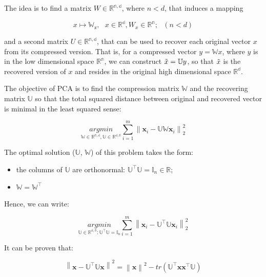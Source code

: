 \documentclass{article}
\begin{document}
The idea is to find a matrix $W \in \mathbb{R^{n,d}}$, where $n < d$, that induces a mapping

\begin{equation}
x \mapsto \mathbb{W_{x}}, ~~~ x \in \mathbb{R^{d}}, W_{x} \in \mathbb{R^{n}};  ~~~ (n<d)
\end{equation}

and a second matrix $U \in \mathbb{R^{n,d}}$, that can be used to recover each original vector $x$ from its compressed version. That is, for a compressed vector $y = \mathbb{W}x$, where $y$ is in the low dimensional space $\mathbb{R^{n}}$, we can construct $\Tilde{x}=\mathbb{U}y$, so that $\Tilde{x}$ is the recovered version of $x$ and resides in the original high dimensional space $\mathbb{R^{d}}$.

The objective of PCA is to find the compression matrix $\mathbb{W}$ and the recovering matrix $\mathbb{U}$ so that the total squared distance between original and recovered vector is minimal in the least squared sense:

\begin{equation}
\underset{\mathbb{W}\in\mathbb{R^{n,d}},\mathbb{U}\in\mathbb{R^{d,n}}}{argmin} \sum_{i=1}^{m} \left \| \textbf{x}_{i}-\mathbb{UW}\textbf{x}_{i}  \right \|_{2}^{2}
\end{equation}

The optimal solution ($\mathbb{U}$, $\mathbb{W}$) of this problem takes the form:

\begin{itemize}
    \item the columns of $\mathbb{U}$ are orthonormal: $\mathbb{U}^{\top}\mathbb{U} = \mathbb{I}_{n}\in \mathbb{R}$;
    \item $\mathbb{W} = \mathbb{W^{\top}}$
\end{itemize}

Hence, we can write:

\begin{equation}
\underset{\mathbb{U}\in\mathbb{R^{d,n}}: \mathbb{U}^{\top}\mathbb{U}=\mathbb{I}_{n} }{argmin} \sum_{i=1}^{m} \left \| \textbf{x}_{i}-\mathbb{U}^{\top}\mathbb{U}\textbf{x}_{i}  \right \|_{2}^{2}
\end{equation}

It can be proven that:

\begin{equation}
\left \| \textbf{x}-\mathbb{U}^{\top}\mathbb{U}\textbf{x}  \right \|^{2} = \left \|  \textbf{x} \right \|^{2} - tr(\mathbb{U}^{\top}\textbf{x}\textbf{x}^{\top}\mathbb{U})
\end{equation}
\end{document}
